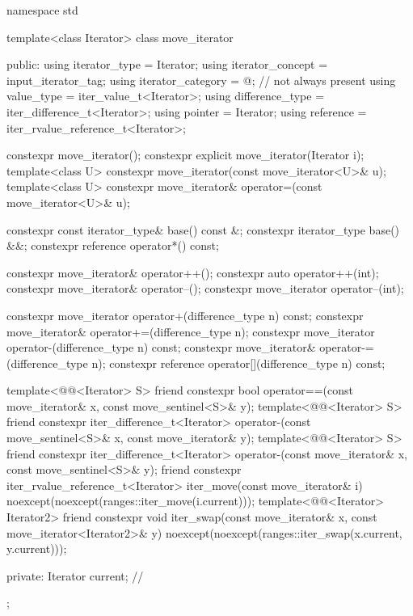 %
\begin{codeblock}
namespace std {
  template<class Iterator>
  class move_iterator {
  public:
    using iterator_type     = Iterator;
    using iterator_concept  = input_iterator_tag;
    using iterator_category = @\seebelow@;                      // not always present
    using value_type        = iter_value_t<Iterator>;
    using difference_type   = iter_difference_t<Iterator>;
    using pointer           = Iterator;
    using reference         = iter_rvalue_reference_t<Iterator>;

    constexpr move_iterator();
    constexpr explicit move_iterator(Iterator i);
    template<class U> constexpr move_iterator(const move_iterator<U>& u);
    template<class U> constexpr move_iterator& operator=(const move_iterator<U>& u);

    constexpr const iterator_type& base() const &;
    constexpr iterator_type base() &&;
    constexpr reference operator*() const;

    constexpr move_iterator& operator++();
    constexpr auto operator++(int);
    constexpr move_iterator& operator--();
    constexpr move_iterator operator--(int);

    constexpr move_iterator operator+(difference_type n) const;
    constexpr move_iterator& operator+=(difference_type n);
    constexpr move_iterator operator-(difference_type n) const;
    constexpr move_iterator& operator-=(difference_type n);
    constexpr reference operator[](difference_type n) const;

    template<@@<Iterator> S>
      friend constexpr bool
        operator==(const move_iterator& x, const move_sentinel<S>& y);
    template<@@<Iterator> S>
      friend constexpr iter_difference_t<Iterator>
        operator-(const move_sentinel<S>& x, const move_iterator& y);
    template<@@<Iterator> S>
      friend constexpr iter_difference_t<Iterator>
        operator-(const move_iterator& x, const move_sentinel<S>& y);
    friend constexpr iter_rvalue_reference_t<Iterator>
      iter_move(const move_iterator& i)
        noexcept(noexcept(ranges::iter_move(i.current)));
    template<@@<Iterator> Iterator2>
      friend constexpr void
        iter_swap(const move_iterator& x, const move_iterator<Iterator2>& y)
          noexcept(noexcept(ranges::iter_swap(x.current, y.current)));

  private:
    Iterator current;   // \expos
  };
}
\end{codeblock}


